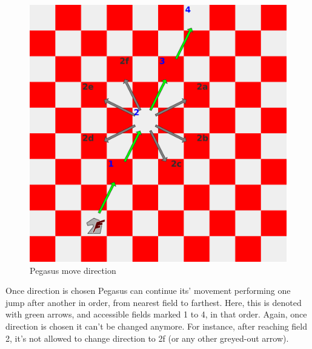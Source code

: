 \documentclass[a5paper,12pt,draft]{book} %
\begin{document}
\noindent
\begin{figure}[!t]
\includegraphics[width=1.0\textwidth, keepaspectratio=true]{../gfx/examples/02_move_pegasus_direction.png}
\caption{Pegasus move direction}
\label{fig:pegasus_move_direction}
\end{figure}
\indent
Once direction is chosen Pegasus can continue its' movement performing one jump
after another in order, from nearest field to farthest. Here, this is denoted
with green arrows, and accessible fields marked 1 to 4, in that order. Again,
once direction is chosen it can't be changed anymore. For instance, after
reaching field 2, it's not allowed to change direction to 2f (or any other
greyed-out arrow).
\end{document}
